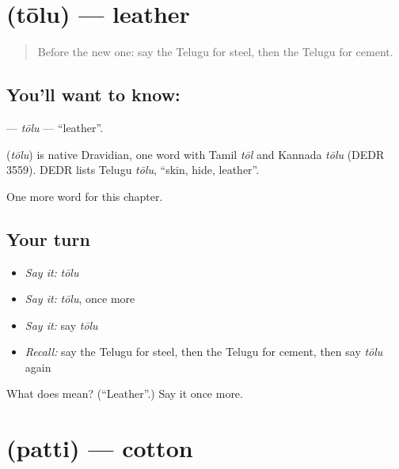 \section[\texorpdfstring{\te{తోలు} (tōlu)}{తోలు (tōlu)}]{ (tōlu) — leather}

\label{lesson:TE-C306-tolu}



\begin{quote}
Before the new one: say the Telugu for steel, then the Telugu for cement.
\end{quote}

\subsection*{You'll want to know: }
\textbf{} — \emph{tōlu} — \textquotedblleft{}leather\textquotedblright{}.

\begin{cousinweb}
\textbf{} (\emph{tōlu}) is native Dravidian, one word with Tamil \emph{tōl} and Kannada \emph{tōlu} (DEDR 3559). DEDR lists Telugu \emph{tōlu}, \textquotedblleft{}skin, hide, leather\textquotedblright{}.
\end{cousinweb}

\begin{grammarlens}[title={What you've built}]
One more word for this chapter.
\end{grammarlens}

\subsection*{Your turn}
\begin{itemize}
\raggedright
  \item \emph{Say it:} \emph{tōlu}
  \item \emph{Say it:} \emph{tōlu}, once more
  \item \emph{Say it:} say \emph{tōlu}
  \item \emph{Recall:} say the Telugu for steel, then the Telugu for cement, then say \emph{tōlu} again
\end{itemize}

\begin{tcolorbox}[breakable,colback=teal!4,colframe=teal!35!black,title={Before you move on}]
What does  mean? (\textquotedblleft{}Leather\textquotedblright{}.) Say it once more.
\end{tcolorbox}
\section[\texorpdfstring{\te{పత్తి} (patti)}{పత్తి (patti)}]{ (patti) — cotton}

